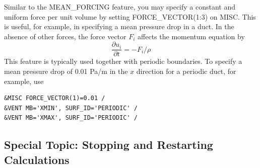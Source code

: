 \documentclass[11pt]{book}
\begin{document}
Similar to the {\ct MEAN\_FORCING} feature, you may specify a constant and uniform force per unit volume by setting {\ct FORCE\_VECTOR(1:3)} on {\ct MISC}.  This is useful, for example, in specifying a mean pressure drop in a duct.  In the absence of other forces, the force vector $F_i$ affects the momentum equation by
\begin{equation}
\frac{\partial u_i}{\partial t} = -F_i/\rho
\end{equation}
This feature is typically used together with periodic boundaries.  To specify a mean pressure drop of 0.01 Pa/m in the $x$ direction for a periodic duct, for example, use
\begin{lstlisting}
&MISC FORCE_VECTOR(1)=0.01 /
&VENT MB='XMIN', SURF_ID='PERIODIC' /
&VENT MB='XMAX', SURF_ID='PERIODIC' /
\end{lstlisting}

\subsection{Special Topic: Stopping and Restarting Calculations}
\label{info:restart}
\end{document}
